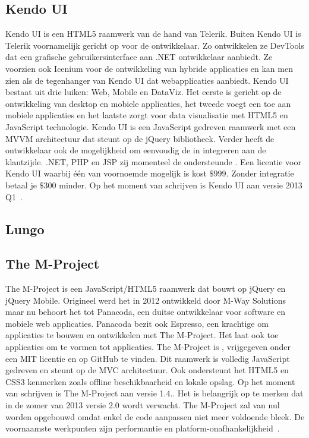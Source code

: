 \subsection{Kendo UI} %
Kendo UI is een HTML5 raamwerk van de hand van Telerik.
Buiten Kendo UI is Telerik voornamelijk gericht op  voor de ontwikkelaar.
Zo ontwikkelen ze DevTools dat een grafische gebruikersinterface aan .NET ontwikkelaar aanbiedt.
Ze voorzien ook Icenium voor de ontwikkeling van hybride applicaties en kan men zien als de tegenhanger van Kendo UI dat webapplicaties aanbiedt.
Kendo UI bestaat uit drie luiken:  Web, Mobile en DataViz.  
Het eerste is gericht op de ontwikkeling van desktop en mobiele applicaties,  het tweede voegt een  toe aan mobiele applicaties en het laatste zorgt voor data visualisatie met HTML5 en JavaScript technologie.
Kendo UI is een JavaScript gedreven raamwerk met een MVVM architectuur dat steunt op de jQuery bibliotheek.
Verder heeft de ontwikkelaar ook de mogelijkheid om eenvoudig de  in integreren aan de klantzijde.
.NET,  PHP en JSP zij momenteel de ondersteunde .
Een licentie voor Kendo UI waarbij één van voornoemde  mogelijk is kost $\$999$.
Zonder  integratie betaal je $\$300$ minder.
Op het moment van schrijven is Kendo UI aan versie 2013 Q1~\cite{Telerik}. 


\subsection{Lungo} %

\subsection{The M-Project} %
The M-Project is een JavaScript/HTML5 raamwerk dat bouwt op jQuery en jQuery Mobile.
Origineel werd het in 2012 ontwikkeld door M-Way Solutions maar nu behoort het tot Panacoda,  een duitse ontwikkelaar voor software  en mobiele web applicaties.
Panacoda bezit ook Espresso,  een krachtige  om applicaties te bouwen en ontwikkelen met The M-Project.
Het laat ook toe applicaties om te vormen tot  applicaties. 
The M-Project is ,  vrijgegeven onder een MIT licentie en op GitHub te vinden.
Dit raamwerk is volledig JavaScript gedreven en steunt op de MVC architectuur.
Ook ondersteunt het HTML5 en CSS3 kenmerken zoals offline  beschikbaarheid en lokale opslag.
Op het moment van schrijven is The M-Project aan versie 1.4..  
Het is belangrijk op te merken dat in de zomer van 2013 versie 2.0 wordt verwacht.  
The M-Project zal van nul worden opgebouwd omdat enkel de code aanpassen niet meer voldoende bleek.  
De voornaamste werkpunten zijn performantie en platform-onafhankelijkheid~\cite{Panacoda,Laubach2013}.

